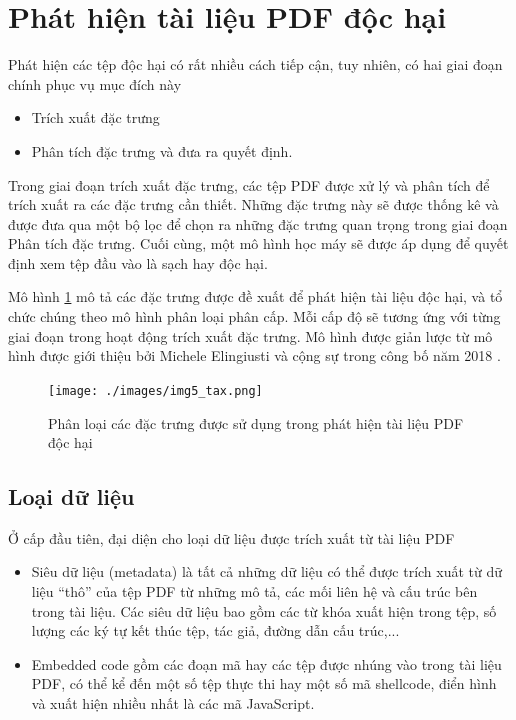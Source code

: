 \documentclass[./../main.tex]{subfiles}
\begin{document}
\section{Phát hiện tài liệu PDF độc hại}

Phát hiện các tệp độc hại có rất nhiều cách tiếp cận, tuy nhiên, có hai giai đoạn chính phục vụ mục đích này

\begin{itemize}
	\item Trích xuất đặc trưng
	\item Phân tích đặc trưng và đưa ra quyết định.
\end{itemize}


Trong giai đoạn trích xuất đặc trưng, các tệp PDF được xử lý và phân tích để trích xuất ra các đặc trưng cần thiết. Những đặc trưng này sẽ được thống kê và được đưa qua một bộ lọc để chọn ra những đặc trưng quan trọng trong giai đoạn Phân tích đặc trưng. Cuối cùng, một mô hình học máy sẽ được áp dụng để quyết định xem tệp đầu vào là sạch hay độc hại.

Mô hình \ref{fig:img5_tax} mô tả các đặc trưng được đề xuất để phát hiện tài liệu độc hại, và tổ chức chúng theo mô hình phân loại phân cấp. Mỗi cấp độ sẽ tương ứng với từng giai đoạn trong hoạt động trích xuất đặc trưng. Mô hình được giản lược từ mô hình được giới thiệu bởi Michele Elingiusti và cộng sự trong công bố năm 2018 \cite{tax}.

\begin{figure}[ht!]
	\centering
	\texttt{[image: ./images/img5\_tax.png]}
	\caption{Phân loại các đặc trưng được sử dụng trong phát hiện tài liệu PDF độc hại}
	\label{fig:img5_tax}
\end{figure}


\subsection*{Loại dữ liệu}
Ở cấp đầu tiên, đại diện cho loại dữ liệu được trích xuất từ tài liệu PDF

\begin{itemize}
	\item Siêu dữ liệu (metadata) là tất cả những dữ liệu có thể được trích xuất từ dữ liệu “thô” của tệp PDF từ những mô tả, các mối liên hệ và cấu trúc bên trong tài liệu. Các siêu dữ liệu bao gồm các từ khóa xuất hiện trong tệp, số lượng các ký tự kết thúc tệp, tác giả, đường dẫn cấu trúc,...
	\item Embedded code gồm các đoạn mã hay các tệp được nhúng vào trong tài liệu PDF, có thể kể đến một số tệp thực thi hay một số mã shellcode, điển hình và xuất hiện nhiều nhất là các mã JavaScript.
\end{itemize}
\end{document}

